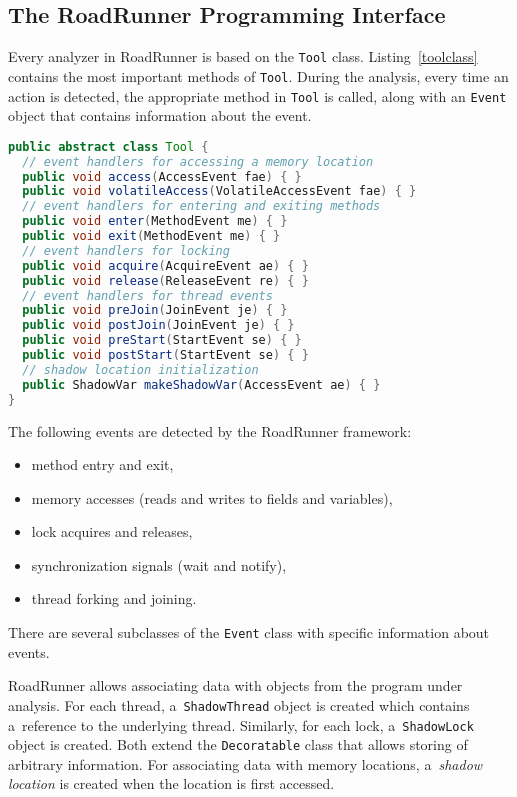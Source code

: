 \subsection{The RoadRunner Programming Interface}

Every analyzer in RoadRunner is based on the \texttt{Tool} class.
Listing~\ref{toolclass} contains the most important methods of \texttt{Tool}.
During the analysis, every time an action is detected, the appropriate method in
\texttt{Tool} is called, along with an \texttt{Event} object that contains
information about the event.

\begin{lstlisting}[language=java, label=toolclass, float, caption={The abstract
class \texttt{Tool}. Only selected public methods are shown.}]
public abstract class Tool {
  // event handlers for accessing a memory location
  public void access(AccessEvent fae) { }
  public void volatileAccess(VolatileAccessEvent fae) { }
  // event handlers for entering and exiting methods
  public void enter(MethodEvent me) { }
  public void exit(MethodEvent me) { }
  // event handlers for locking
  public void acquire(AcquireEvent ae) { }
  public void release(ReleaseEvent re) { }
  // event handlers for thread events
  public void preJoin(JoinEvent je) { }
  public void postJoin(JoinEvent je) { }
  public void preStart(StartEvent se) { }
  public void postStart(StartEvent se) { }
  // shadow location initialization
  public ShadowVar makeShadowVar(AccessEvent ae) { }
}
\end{lstlisting}

The following events are detected by the RoadRunner framework:
\begin{itemize}
    \item method entry and exit,
    \item memory accesses (reads and writes to fields and variables),
    \item lock acquires and releases,
    \item synchronization signals (wait and notify),
    \item thread forking and joining.
\end{itemize}

There are several subclasses of the \texttt{Event} class with specific
information about events.

RoadRunner allows associating data with objects from the program under analysis.
For each thread, a~\texttt{ShadowThread} object is created which contains
a~reference to the underlying thread. Similarly, for each lock,
a~\texttt{ShadowLock} object is created. Both extend the \texttt{Decoratable}
class that allows storing of arbitrary information. For associating data with
memory locations, a~\emph{shadow location} is created when the location is first
accessed.

